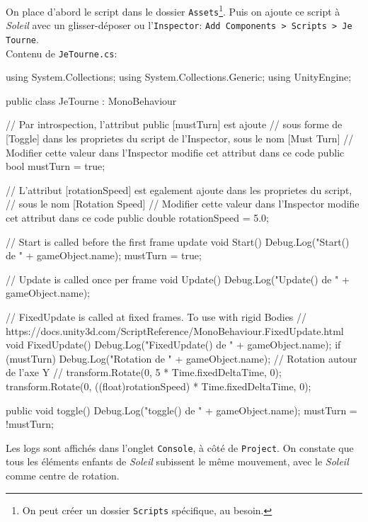\documentclass[a4paper,10pt]{article}
\newenvironment{solution}%
{\begin{tcolorbox}[breakable,colback=red!5!white,colframe=red!75!black,title=Solution]}%
{\end{tcolorbox}}
\newenvironment{boxcode}%
{\begin{tcolorbox}[breakable,colback=gray!5!white,colframe=black]}%
	{\end{tcolorbox}}
\begin{document}
\ifversionenseignant
\begin{solution}
	On place d'abord le script dans le dossier \texttt{Assets}\footnote{On peut créer un dossier \texttt{Scripts} spécifique, au besoin.}. Puis on ajoute ce script à \textit{Soleil} avec un glisser-déposer ou l'\texttt{Inspector}: \texttt{Add Components > Scripts > Je Tourne}. \\
	
Contenu de \lstinline|JeTourne.cs|:

\begin{boxcode}
	\begin{csharpsansbord}
using System.Collections;
using System.Collections.Generic;
using UnityEngine;

public class JeTourne : MonoBehaviour
{
	// Par introspection, l'attribut public [mustTurn] est ajoute 
	// sous forme de [Toggle] dans les proprietes du script de l'Inspector, 
	sous le nom [Must Turn]
	// Modifier cette valeur dans l'Inspector modifie cet attribut dans ce code
	public bool mustTurn = true;
	
	// L'attribut [rotationSpeed] est egalement ajoute dans les proprietes du script,
	// sous le nom [Rotation Speed]
	// Modifier cette valeur dans l'Inspector modifie cet attribut dans ce code
	public double rotationSpeed = 5.0;
		
	
	// Start is called before the first frame update
	void Start()
	{
		Debug.Log("Start() de " + gameObject.name);
		mustTurn = true;
	}
	
	// Update is called once per frame
	void Update()
	{
		Debug.Log("Update() de " + gameObject.name);
	}
	
	// FixedUpdate is called at fixed frames. To use with rigid Bodies
	// https://docs.unity3d.com/ScriptReference/MonoBehaviour.FixedUpdate.html
	void FixedUpdate()
	{
		Debug.Log("FixedUpdate() de " + gameObject.name);
		if (mustTurn)
		{
		    Debug.Log("Rotation de " + gameObject.name);
			// Rotation autour de l'axe Y
			//    transform.Rotate(0, 5 * Time.fixedDeltaTime, 0);
			transform.Rotate(0, ((float)rotationSpeed) * Time.fixedDeltaTime, 0);
		}
	}
	
	public void toggle()
	{
		Debug.Log("toggle() de " + gameObject.name);
		mustTurn = !mustTurn;
	}
}
	\end{csharpsansbord}
\end{boxcode}	


Les logs sont affichés dans l'onglet \texttt{Console}, à côté de \texttt{Project}. On constate que tous les éléments enfants de \textit{Soleil} subissent le même mouvement, avec le \textit{Soleil} comme centre de rotation.
\end{solution}
\fi 
\end{document}
